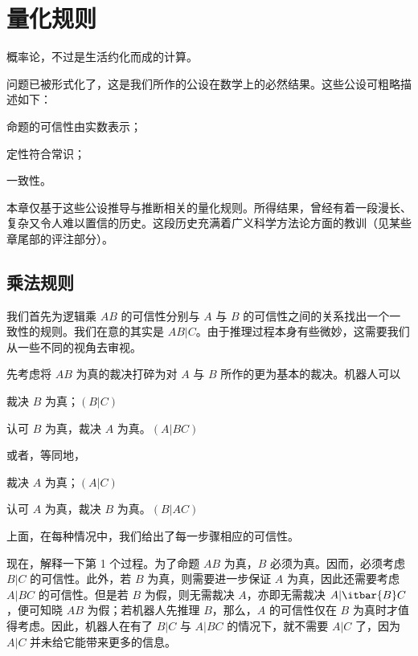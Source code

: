 \chapter[quantitative-rules]{量化规则}

\startdictum
概率论，不过是生活约化而成的计算。
  
\stopdictum

\indentation 问题已被形式化了，这是我们所作的公设在数学上的必然结果。这些公设可粗略描述如下：

\startitemize[R]
\item 命题的可信性由实数表示；
\item 定性符合常识；
\item 一致性。
\stopitemize

\noindent 本章仅基于这些公设推导与推断相关的量化规则。所得结果，曾经有着一段漫长、复杂又令人难以置信的历史。这段历史充满着广义科学方法论方面的教训（见某些章尾部的评注部分）。

\section{乘法规则}

我们首先为逻辑乘 $AB$ 的可信性分别与 $A$ 与 $B$ 的可信性之间的关系找出一个一致性的规则。我们在意的其实是 $AB|C$。由于推理过程本身有些微妙，这需要我们从一些不同的视角去审视。

先考虑将 $AB$ 为真的裁决打碎为对 $A$ 与 $B$ 所作的更为基本的裁决。机器人可以

\startitemize[n]
\item 裁决 $B$ 为真；\hfill $(B|C)$
\item 认可 $B$ 为真，裁决 $A$ 为真。\hfill $(A|BC)$
\stopitemize

\noindent 或者，等同地，

\startitemize[n]
\item 裁决 $A$ 为真；\hfill $(A|C)$
\item 认可 $A$ 为真，裁决 $B$ 为真。\hfill $(B|AC)$
\stopitemize

\noindent 上面，在每种情况中，我们给出了每一步骤相应的可信性。

现在，解释一下第 1 个过程。为了命题 $AB$ 为真，$B$ 必须为真。因而，必须考虑 $B|C$ 的可信性。此外，若 $B$ 为真，则需要进一步保证 $A$ 为真，因此还需要考虑 $A|BC$ 的可信性。但是若 $B$ 为假，则无需裁决 $A$，亦即无需裁决 $A|\itbar{B}C$，便可知晓 $AB$ 为假；若机器人先推理 $B$，那么，$A$ 的可信性仅在 $B$ 为真时才值得考虑。因此，机器人在有了 $B|C$ 与 $A|BC$ 的情况下，就不需要 $A|C$ 了，因为 $A|C$ 并未给它能带来更多的信息。

